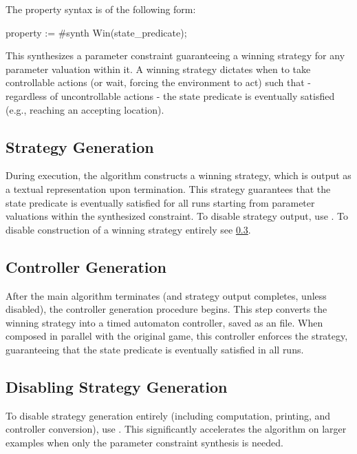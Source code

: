 The property syntax is of the following form:

\begin{IMITATORproperty}
property := #synth Win(state_predicate);
\end{IMITATORproperty}

This synthesizes a parameter constraint guaranteeing a winning strategy for any parameter valuation within it. A winning strategy dictates when to take controllable actions (or wait, forcing the environment to act) such that - regardless of uncontrollable actions - the state predicate is eventually satisfied (e.g., reaching an accepting location).

\subsection{Strategy Generation}\label{section:algorithm:ptg:strategy}
During execution, the algorithm constructs a winning strategy, which is output as a textual representation upon termination. This strategy guarantees that the state predicate is eventually satisfied for all runs starting from parameter valuations within the synthesized constraint. To disable strategy output, use . To disable construction of a winning strategy entirely see \cref{section:algorithm:ptg:no-strategy}.

\subsection{Controller Generation}\label{section:algorithm:ptg:controller}  
After the main algorithm terminates (and strategy output completes, unless disabled), the controller generation procedure begins. This step converts the winning strategy into a timed automaton controller, saved as an \imitator file. When composed in parallel with the original game, this controller enforces the strategy, guaranteeing that the state predicate is eventually satisfied in all runs.



\subsection{Disabling Strategy Generation}\label{section:algorithm:ptg:no-strategy}
To disable strategy generation entirely (including computation, printing, and controller conversion), use . This significantly accelerates the algorithm on larger examples when only the parameter constraint synthesis is needed.


